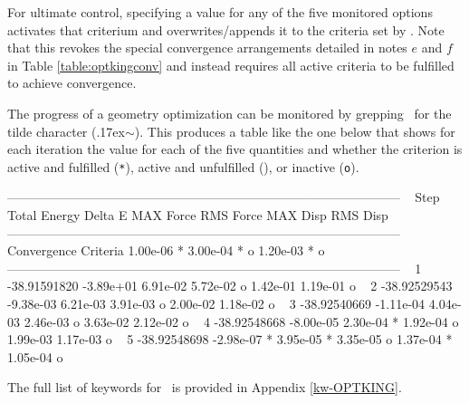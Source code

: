 For ultimate control, specifying a value for any of the five monitored options activates that
criterium and overwrites/appends it to the criteria set by .
Note that this revokes the special convergence arrangements detailed in notes $e$ and $f$ in 
Table \ref{table:optkingconv} and instead requires all active criteria to be fulfilled to 
achieve convergence.

The progress of a geometry optimization can be monitored by grepping \outputdat\ for the
tilde character ({\raise.17ex\hbox{$\scriptstyle\sim$}}). This produces a table like the one below that shows
for each iteration the value for each of the five quantities and whether the criterion
is active and fulfilled (\texttt{*}), active and unfulfilled (\texttt{\;\;}), or inactive (\texttt{o}).
\begin{scriptsize}
\begin{Snippet}
--------------------------------------------------------------------------------------------- ~
 Step     Total Energy     Delta E     MAX Force     RMS Force      MAX Disp      RMS Disp    ~
--------------------------------------------------------------------------------------------- ~
  Convergence Criteria    1.00e-06 *    3.00e-04 *             o    1.20e-03 *             o  ~
--------------------------------------------------------------------------------------------- ~
    1     -38.91591820   -3.89e+01      6.91e-02      5.72e-02 o    1.42e-01      1.19e-01 o  ~
    2     -38.92529543   -9.38e-03      6.21e-03      3.91e-03 o    2.00e-02      1.18e-02 o  ~
    3     -38.92540669   -1.11e-04      4.04e-03      2.46e-03 o    3.63e-02      2.12e-02 o  ~
    4     -38.92548668   -8.00e-05      2.30e-04 *    1.92e-04 o    1.99e-03      1.17e-03 o  ~
    5     -38.92548698   -2.98e-07 *    3.95e-05 *    3.35e-05 o    1.37e-04 *    1.05e-04 o  ~
\end{Snippet}
\end{scriptsize}

The full list of keywords for \PSIoptking\ is provided in Appendix \ref{kw-OPTKING}.

